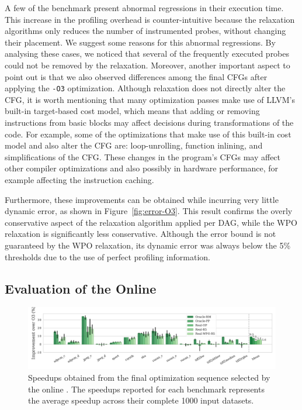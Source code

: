 A few of the benchmark present abnormal regressions in their execution time.
This increase in the profiling overhead is counter-intuitive because the
relaxation algorithms only reduces the number of instrumented probes,
without changing their placement.
We suggest some reasons for this abnormal regressions.
By analysing these cases, we noticed that several of the frequently executed
probes could not be removed by the relaxation.
Moreover, another important aspect to point out is that we also observed
differences among the final CFGs after applying the \texttt{-O3} optimization.
Although relaxation does not directly alter the CFG, it is worth mentioning that
many optimization passes make use of LLVM's built-in target-based cost model,
which means that adding or removing instructions from basic blocks may affect
decisions during transformations of the code.
For example, some of the optimizations that make use of this built-in cost model
and also alter the CFG are: loop-unrolling, function inlining, and
simplifications of the CFG.
These changes in the program's CFGs may affect other compiler optimizations and
also possibly in hardware performance, for example affecting the instruction
caching.

Furthermore, these improvements can be obtained while incurring very little dynamic error, as shown in Figure~\ref{fig:error-O3}.
This result confirms the overly conservative aspect of the relaxation algorithm applied per DAG,
while the WPO relaxation is significantly less conservative.
Although the error bound is not guaranteed by the WPO relaxation,
its dynamic error was always below the 5\% thresholds due to the use
of perfect profiling information.

\subsection{Evaluation of the Online {\IterComp}}

\begin{figure}[t]
    \centering
    \includegraphics[width=\textwidth]{figs/speedups.pdf}
    \caption{Speedups obtained from the final optimization sequence selected by the online {\itercomp}.
	         The speedups reported for each benchmark represents the average speedup across their complete 1000 input datasets.}
    \label{fig:speedups}
\end{figure}

